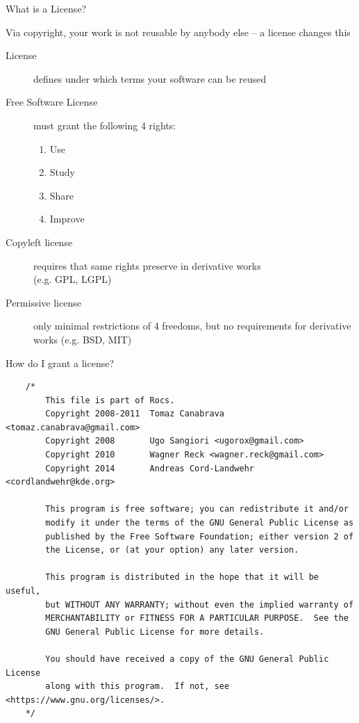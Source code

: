 \documentclass[t,compress,aspectratio=169]{beamer}
\begin{document}
\begin{frame}
    {What is a License?}

    Via copyright, your work is not reusable by anybody else -- a license changes this

    \begin{description}
        \item [License] defines under which terms your software can be reused
        \item [Free Software License] must grant the following 4 rights:
            \begin{enumerate}
                \item Use
                \item Study
                \item Share
                \item Improve
            \end{enumerate}
        \item [Copyleft license] requires that same rights preserve in derivative works\\ (e.g. GPL, LGPL)
        \item [Permissive license] only minimal restrictions of 4 freedoms, but no requirements for derivative works (e.g. BSD, MIT)
    \end{description}
\end{frame}

\begin{frame}[fragile]
    {How do I grant a license?}

    \begin{example}
    \tiny
    \begin{verbatim}
    /*
        This file is part of Rocs.
        Copyright 2008-2011  Tomaz Canabrava <tomaz.canabrava@gmail.com>
        Copyright 2008       Ugo Sangiori <ugorox@gmail.com>
        Copyright 2010       Wagner Reck <wagner.reck@gmail.com>
        Copyright 2014       Andreas Cord-Landwehr <cordlandwehr@kde.org>

        This program is free software; you can redistribute it and/or
        modify it under the terms of the GNU General Public License as
        published by the Free Software Foundation; either version 2 of
        the License, or (at your option) any later version.

        This program is distributed in the hope that it will be useful,
        but WITHOUT ANY WARRANTY; without even the implied warranty of
        MERCHANTABILITY or FITNESS FOR A PARTICULAR PURPOSE.  See the
        GNU General Public License for more details.

        You should have received a copy of the GNU General Public License
        along with this program.  If not, see <https://www.gnu.org/licenses/>.
    */
    \end{verbatim}
    \end{example}
\end{frame}
\end{document}
